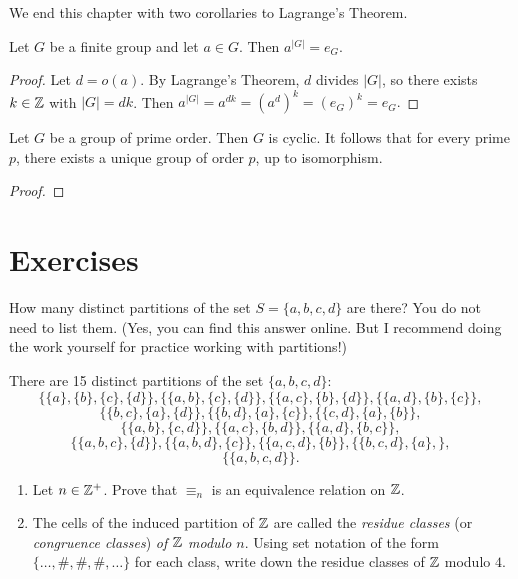  We end this chapter with two corollaries to Lagrange's Theorem.

\begin{cor}\label{} Let $G$ be a finite group and let $a\in G$.  Then
$a^{|G|}=e_G$.
\end{cor}

\begin{proof} Let $d=o(a)$. By Lagrange's Theorem, $d$ divides $|G|$, so
there exists $k\in \mathbb{Z}$ with $|G|=dk$.  Then
$a^{|G|}=a^{dk}=(a^d)^k=(e_G)^k=e_G.$
\end{proof}

\begin{cor}\label{pcyc} Let $G$ be a group of prime order.  Then $G$ is
cyclic. It follows that for every prime $p$, there exists a unique
group of order $p$, up to isomorphism.
\end{cor}

\begin{proof}  \end{proof}

\pagebreak

\section{Exercises}
\begin{exercise}
How many distinct partitions of the set
    $S=\{a,b,c,d\}$ are there?  You do not need to list them.
    (Yes, you can find this answer online.  But I recommend
    doing the work yourself for practice working with
    partitions!)
\end{exercise}

\begin{solution}[print=true]
There are 15 distinct partitions of the set $\{a,b,c,d\}$:
    $$\{\{a\},\{b\},\{c\},\{d\}\}, \{\{a,b\},\{c\},\{d\}\},\{\{a,c\},\{b\},\{d\}\},\{\{a,d\},\{b\},\{c\}\},$$
    $$\{\{b,c\},\{a\},\{d\}\},\{\{b,d\},\{a\},\{c\}\},\{\{c,d\},\{a\},\{b\}\},$$
    $$\{\{a,b\},\{c,d\}\},
    \{\{a,c\},\{b,d\}\},\{\{a,d\},\{b,c\}\},$$
    $$\{\{a,b,c\},\{d\}\},\{\{a,b,d\},\{c\}\},\{\{a,c,d\},\{b\}\},\{\{b,c,d\},\{a\},\},$$
    $$\{\{a,b,c,d\}\}.$$

\end{solution}

\begin{exercise}
\begin{enumerate}
\item
Let  $n\in \mathbb{Z}^+$. Prove that  $\equiv_n$ is an equivalence relation on $\mathbb{Z}$.
\item The cells of the induced partition of $\mathbb{Z}$ are called
    the \textit{residue classes} (or \textit{congruence classes}) {\it of $\mathbb{Z}$ modulo $n$}.  Using
    set notation of the form $\{\ldots,\#, \#,\#,\ldots\}$
    for each class, write down the residue classes of $\mathbb{Z}$
    modulo $4$.
\end{enumerate}
\end{exercise}

